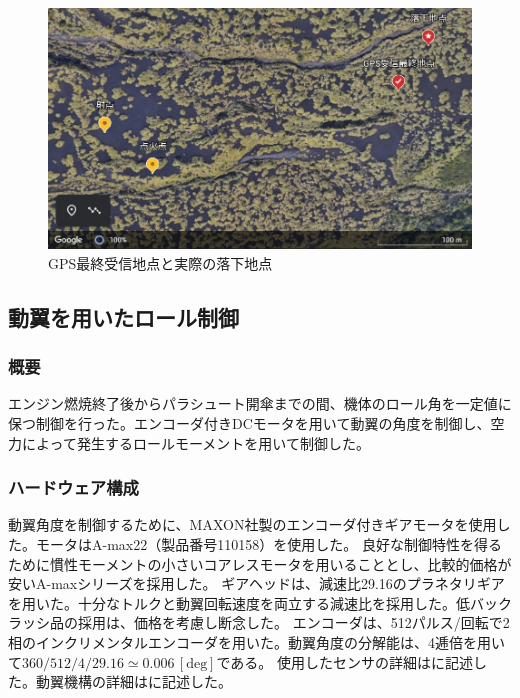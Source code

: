 \documentclass[a4paper,11pt,titlepage,uplatex]{jsarticle}
\begin{document}
\begin{figure}[H]
	\centering
	\includegraphics[width=0.8\linewidth]{pic_avi/GPS_data.jpg}
	\caption{GPS最終受信地点と実際の落下地点}
	\label{fig:GPS_data}
\end{figure}

\subsection{動翼を用いたロール制御}
\subsubsection{概要}
エンジン燃焼終了後からパラシュート開傘までの間、機体のロール角を一定値に保つ制御を行った。エンコーダ付きDCモータを用いて動翼の角度を制御し、空力によって発生するロールモーメントを用いて制御した。
\subsubsection{ハードウェア構成}
動翼角度を制御するために、MAXON社製のエンコーダ付きギアモータを使用した。モータはA-max22（製品番号110158）を使用した。
良好な制御特性を得るために慣性モーメントの小さいコアレスモータを用いることとし、比較的価格が安いA-maxシリーズを採用した。
ギアヘッドは、減速比29.16のプラネタリギアを用いた。十分なトルクと動翼回転速度を両立する減速比を採用した。低バックラッシ品の採用は、価格を考慮し断念した。
エンコーダは、512パルス/回転で2相のインクリメンタルエンコーダを用いた。動翼角度の分解能は、4逓倍を用いて$360/512/4/29.16\simeq 0.006\,[\mathrm{deg}]$である。
使用したセンサの詳細はに記述した。動翼機構の詳細はに記述した。
\end{document}
